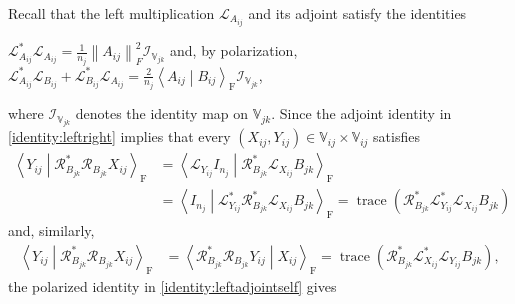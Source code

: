 \documentclass[oneside]{amsart}
\theoremstyle{plain}
\theoremstyle{definition}
\theoremstyle{remark}
\numberwithin{equation}{section}
\DeclareMathOperator{\trace}{trace}
\begin{document}
Recall that the left multiplication $\mathcal{L}_{A_{ij}}$ and its adjoint
satisfy the identities
\begin{enumerate}[label={[\Alph*]},
ref={[\Alph*]}]
\addtocounter{enumi}{6}%
\item\label{identity:leftadjointself}%
$\mathcal{L}^{*}_{A_{ij}} \mathcal{L}_{A_{ij}} = \frac{1}{n_{j}}
\left\lVert A_{ij}\right\rVert_{F}^{2} \mathcal{I}_{\mathbb{V}_{jk}}$ and,
by polarization, $\mathcal{L}^{*}_{A_{ij}} \mathcal{L}_{B_{ij}} +
\mathcal{L}^{*}_{B_{ij}} \mathcal{L}_{A_{ij}} = \frac{2}{n_{j}}
\left\langle A_{ij} \middle| B_{ij} \right\rangle_{\mathrm{F}}
\mathcal{I}_{\mathbb{V}_{jk}}$,

\end{enumerate}
where $\mathcal{I}_{\mathbb{V}_{jk}}$ denotes the identity map on
$\mathbb{V}_{jk}$. Since the adjoint identity in \ref{identity:leftright}
implies that every $(X_{ij}, Y_{ij}) \in \mathbb{V}_{ij} \times
\mathbb{V}_{ij}$ satisfies
\[
\begin{split}
\left\langle Y_{ij} \middle| \mathcal{R}^{*}_{B_{jk}} \mathcal{R}_{B_{jk}}
X_{ij} \right\rangle_{\mathrm{F}}
%
&= \left\langle \mathcal{L}_{Y_{ij}} I_{n_{j}} \middle|
\mathcal{R}^{*}_{B_{jk}} \mathcal{L}_{X_{ij}} B_{jk}
\right\rangle_{\mathrm{F}}
\\
&= \left\langle I_{n_{j}} \middle| \mathcal{L}^{*}_{Y_{ij}}
\mathcal{R}^{*}_{B_{jk}} \mathcal{L}_{X_{ij}} B_{jk}
\right\rangle_{\mathrm{F}}
%
= \trace\left( \mathcal{R}^{*}_{B_{jk}} \mathcal{L}^{*}_{Y_{ij}}
\mathcal{L}_{X_{ij}} B_{jk} \right)
\end{split}
\]
and, similarly,
\[
\begin{split}
\left\langle Y_{ij} \middle| \mathcal{R}^{*}_{B_{jk}} \mathcal{R}_{B_{jk}}
X_{ij} \right\rangle_{\mathrm{F}}
%
&= \left\langle \mathcal{R}^{*}_{B_{jk}} \mathcal{R}_{B_{jk}} Y_{ij}
\middle| X_{ij} \right\rangle_{\mathrm{F}}
%
= \trace\left( \mathcal{R}^{*}_{B_{jk}} \mathcal{L}^{*}_{X_{ij}}
\mathcal{L}_{Y_{ij}} B_{jk} \right),
\end{split}
\]
the polarized identity in \ref{identity:leftadjointself} gives
\end{document}
